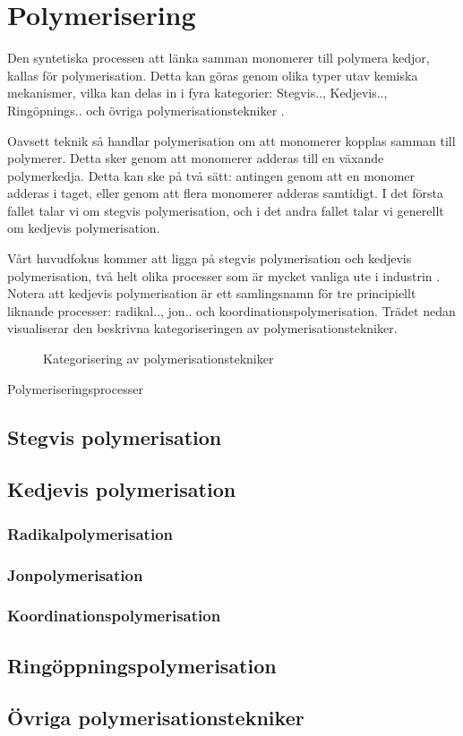 \section{Polymerisering}
Den syntetiska processen att länka samman monomerer till polymera kedjor, kallas för polymerisation. Detta kan göras genom olika typer utav kem\-iska mekanismer, vilka kan delas in i fyra kategorier: Stegvis.., Kedjevis.., Ringöpnings.. och övriga polymerisationstekniker \cite[s. 117]{polym}.

Oavsett teknik så handlar polymerisation om att monomerer kopplas samman till polymerer. Detta sker genom att monomerer adderas till en växande polymerkedja. Detta kan ske på två sätt: antingen genom att en monomer adderas i taget, eller genom att flera monomerer adderas samtidigt. I det första fallet talar vi om stegvis polymerisation, och i det andra fallet talar vi generellt om kedjevis polymerisation.

Vårt huvudfokus kommer att ligga på stegvis polymerisation och kedjevis polymerisation, två helt olika processer som är mycket vanliga ute i industrin \cite[s. 131]{polym}. Notera att kedjevis polymerisation är ett samlingsnamn för tre principiellt liknande processer: radikal.., jon.. och koordinationspolymerisation. Trädet nedan visualiserar den beskrivna kategoriseringen av polymerisationstekniker.

\begin{figure}[ht]
    \centering
    
    \caption{Kategorisering av polymerisationstekniker \cite[s.117]{polym}}
    \label{fig:polymerisations_typer}
\end{figure}

Polymeriseringsprocesser
\subsection{Stegvis polymerisation}



\subsection{Kedjevis polymerisation}
\subsubsection{Radikalpolymerisation}
\subsubsection{Jonpolymerisation}
\subsubsection{Koordinationspolymerisation}
\subsection{Ringöppningspolymerisation}
\subsection{Övriga polymerisationstekniker}
